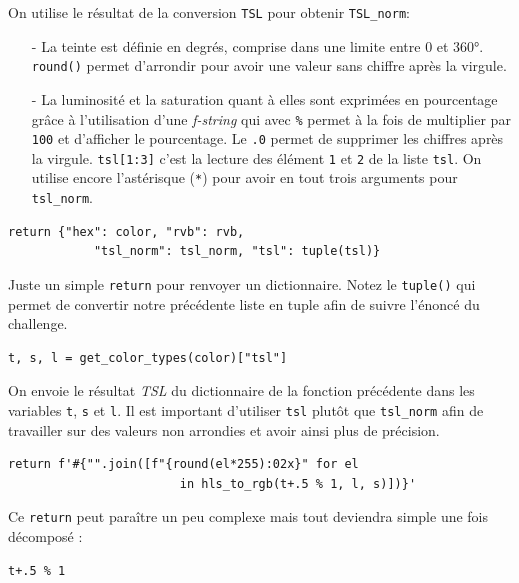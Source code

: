 On utilise le résultat de la conversion \texttt{TSL} pour obtenir \texttt{TSL\_norm}:
\begin{itemize}
	\item[-] La teinte est définie en degrés, comprise dans une limite entre 0 et 360°. \texttt{round()} permet d'arrondir pour avoir une valeur sans chiffre après la virgule. 
	\item[-] La luminosité et la saturation quant à elles sont exprimées en pourcentage grâce à l'utilisation d'une \textit{f-string} qui avec \og \texttt{\%}\fg{} permet à la fois de multiplier par \texttt{100} et d'afficher le pourcentage. Le \texttt{.0} permet de supprimer les chiffres après la virgule. \texttt{tsl[1:3]} c'est la lecture des élément \texttt{1} et \texttt{2} de la liste \texttt{tsl}. On utilise encore l'astérisque (\texttt{*}) pour avoir en tout trois arguments pour \texttt{tsl\_norm}.
\end{itemize}
\medskip

\begin{lstlisting}
return {"hex": color, "rvb": rvb,
            "tsl_norm": tsl_norm, "tsl": tuple(tsl)}
\end{lstlisting}
\medskip

Juste un simple \texttt{return} pour renvoyer un dictionnaire. Notez le \texttt{tuple()} qui permet de convertir notre précédente liste en tuple afin de suivre l'énoncé du challenge.
\medskip

\begin{lstlisting}
t, s, l = get_color_types(color)["tsl"]
\end{lstlisting}
\medskip

On envoie le résultat \textit{TSL} du dictionnaire de la fonction précédente dans les variables \texttt{t}, \texttt{s} et \texttt{l}. Il est important d'utiliser \texttt{tsl} plutôt que \texttt{tsl\_norm} afin de travailler sur des valeurs non arrondies et avoir ainsi plus de précision.
\medskip

\begin{lstlisting}
return f'#{"".join([f"{round(el*255):02x}" for el 
                        in hls_to_rgb(t+.5 % 1, l, s)])}'
\end{lstlisting}
\medskip

Ce \texttt{return} peut paraître un peu complexe mais tout deviendra simple une fois décomposé :
\medskip

\begin{verbatim}
t+.5 % 1
\end{verbatim}
\medskip

